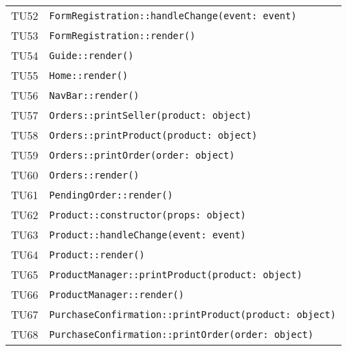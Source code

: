 \begin{longtable}{ >{\centering}p{} >{}p{}}
			\hypertarget{TU52}{TU52} & 
			\texttt{FormRegistration::handleChange(event: event)}\\

			\hypertarget{TU53}{TU53} & 
			\texttt{FormRegistration::render()}\\

			\hypertarget{TU54}{TU54} & 
			\texttt{Guide::render()}\\

			\hypertarget{TU55}{TU55} & 
			\texttt{Home::render()}\\

			\hypertarget{TU56}{TU56} & 
			\texttt{NavBar::render()}\\

			\hypertarget{TU57}{TU57} & 
			\texttt{Orders::printSeller(product: object)}\\

			\hypertarget{TU58}{TU58} & 
			\texttt{Orders::printProduct(product: object)}\\

			\hypertarget{TU59}{TU59} & 
			\texttt{Orders::printOrder(order: object)}\\

			\hypertarget{TU60}{TU60} & 
			\texttt{Orders::render()}\\

			\hypertarget{TU61}{TU61} & 
			\texttt{PendingOrder::render()}\\

			\hypertarget{TU62}{TU62} & 
			\texttt{Product::constructor(props: object)}\\

			\hypertarget{TU63}{TU63} & 
			\texttt{Product::handleChange(event: event)}\\

			\hypertarget{TU64}{TU64} & 
			\texttt{Product::render()}\\

			\hypertarget{TU65}{TU65} & 
			\texttt{ProductManager::printProduct(product: object)}\\

			\hypertarget{TU66}{TU66} & 
			\texttt{ProductManager::render()}\\

			\hypertarget{TU67}{TU67} & 
			\texttt{PurchaseConfirmation::printProduct(product: object)}\\

			\hypertarget{TU68}{TU68} & 
			\texttt{PurchaseConfirmation::printOrder(order: object)}\\


\end{longtable}
